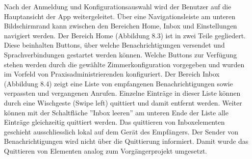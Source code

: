 Nach der Anmeldung und Konfigurationsauswahl wird der Benutzer auf die Hauptansicht der App weitergeleitet.
Über eine Navigationsleiste am unteren Bildschirmrand kann zwischen den Bereichen Home, Inbox und Einstellungen navigiert werden.
Der Bereich Home (Abbildung 8.3) ist in zwei Teile gegliedert.
Diese beinhalten Buttons, über welche Benachrichtigungen versendet und Sprachverbindungen gestartet werden können.
Welche Buttons zur Verfügung stehen werden durch die gewählte Zimmerkonfiguration vorgegeben und wurden im Vorfeld von Praxisadministrierenden konfiguriert.
Der Bereich Inbox (Abbildung 8.4) zeigt eine Liste von empfangenen Benachrichtigungen sowie verpassten und vergangenen Anrufen.
Einzelne Einträge in dieser Liste können durch eine Wischgeste (Swipe left) quittiert und damit entfernt werden.
Weiter können mit der Schaltfläche ''Inbox leeren'' am unteren Ende der Liste alle Einträge gleichzeitig quittiert werden.
Das quittieren von Inboxelementen geschieht ausschliesslich lokal auf dem Gerät des Empfängers.
Der Sender von Benachrichtigungen wird nicht über die Quittierung informiert.
Damit wurde das Quittieren von Elementen analog zum Vorgängerprojekt umgesetzt.

